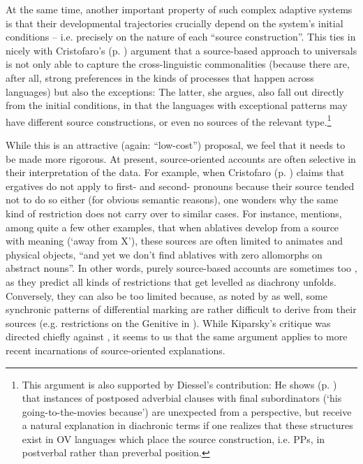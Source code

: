 \documentclass[output=paper]{langsci/langscibook}
\begin{document}
\newpage 
At the same time, another important property of such complex adaptive systems is that their developmental trajectories crucially depend on the system’s initial conditions – i.e. precisely on the nature of each “source construction”. This ties in nicely with Cristofaro’s (p. \pageref{p:cristofaro:commonalitiesexceptions}) argument that a source-based approach to universals is not only able to capture the cross-linguistic commonalities (because there are, after all, strong preferences in the kinds of  processes that happen across languages) but also the exceptions: The latter, she argues, also fall out directly from the initial conditions, in that the languages with exceptional patterns may have different source constructions, or even no sources of the relevant type.\footnote{This argument is also supported by Diessel’s contribution: He shows (p. \pageref{p:diessel:exception}) that instances of postposed adverbial clauses with final subordinators (‘his going-to-the-movies because’) are unexpected from a  perspective, but receive a natural explanation in diachronic terms if one realizes that these structures exist in OV languages which place the source construction, i.e.  PPs, in postverbal rather than preverbal position.}  

While this is an attractive (again: “low-cost”) proposal, we feel that it needs to be made more rigorous. At present, source-oriented accounts are often selective in their interpretation of the data. For example, when Cristofaro (p. \pageref{p:cristofaro:ergatives}) claims that ergatives do not apply to first- and second- pronouns because their  source tended not to do so either (for obvious semantic reasons), one wonders why the same kind of restriction does not carry over to similar cases. For instance, \citet[36]{Kiparsky2008} mentions, among quite a few other examples, that when ablatives develop from a source with  meaning (‘away from X’), these sources are often limited to animates and physical objects, “and yet we don't find ablatives with zero allomorphs on abstract nouns”. In other words, purely source-based accounts are sometimes too , as they predict all kinds of restrictions that get levelled as diachrony unfolds. Conversely, they can also be too limited because, as noted by \citet{Kiparsky2008} as well, some synchronic patterns of differential marking are rather difficult to derive from their sources (e.g.  restrictions on the Genitive in ). While Kiparsky’s critique was directed chiefly against \citet{Garrett1990}, it seems to us that the same argument applies to more recent incarnations of source-oriented explanations.
\end{document}
